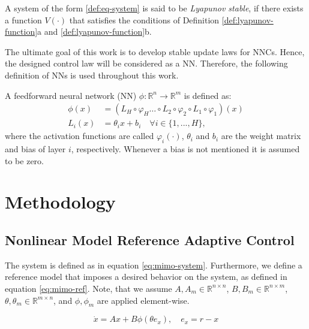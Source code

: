    \begin{definition}
       A system of the form \eqref{def:eq-system} is said to be \textit{Lyapunov stable}, if there exists a function $V(\cdot)$ that satisfies the conditions of Definition \ref{def:lyapunov-function}a and \ref{def:lyapunov-function}b.
       \label{def:lyapunov-stability}
   \end{definition}
   
   The ultimate goal of this work is to develop stable update laws for NNCs. Hence, the designed control law will be considered as a NN. Therefore, the following definition of NNs is used throughout this work.
   
   \begin{definition}
    A feedforward neural network (NN) $\phi:\mathbb{R}^n\rightarrow \mathbb{R}^m$ is defined as:
   \begin{equation}
    \begin{aligned}
    \phi (x) & = (L_{H} \circ \varphi_{H} \dots \circ L_{2} \circ \varphi_{2} \circ L_{1} \circ \varphi_1)(x)\\
    L_i(x) &= \theta_i x + b_i \quad \forall i\in\{1,..., H\},
   \end{aligned}
   \end{equation}
    where the activation functions are called $\varphi_i(\cdot)$, $\theta_i$ and $b_i$ are the weight matrix and bias of layer $i$, respectively. Whenever a bias is not mentioned it is assumed to be zero.
   \end{definition}
\section{Methodology}


\subsection{Nonlinear Model Reference Adaptive Control}
The system is defined as in equation \eqref{eq:mimo-system}. Furthermore, we define a reference model that imposes a desired behavior on the system, as defined in equation \eqref{eq:mimo-ref}. Note, that we assume $A,A_m\in\mathbb{R}^{n \times n}$, $B,B_m\in\mathbb{R}^{n\times m}$, $\theta,\theta_m\in\mathbb{R}^{m\times n}$, and $\phi, \phi_m$ are applied element-wise.

\begin{equation}
 \dot x = Ax + B\phi(\theta e_x), \quad e_x = r-x
    \label{eq:mimo-system}
\end{equation}

